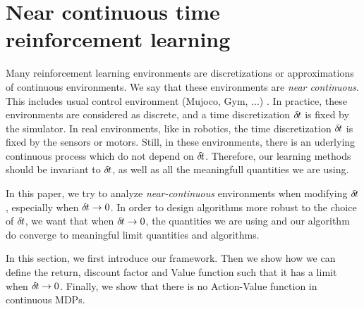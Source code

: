\section{Near continuous time reinforcement learning}
\label{sec:framework}


Many reinforcement learning environments are discretizations or approximations
of continuous environments. We say that these environments are \emph{near
continuous}. This includes usual control environment (Mujoco, Gym, ...)
. In practice, these environments are considered as discrete, and a
time discretization ${\delta\hspace{-.1em}t}$ is fixed by the simulator. In real environments,
like in robotics, the time discretization ${\delta\hspace{-.1em}t}$ is fixed by the sensors or
motors. Still, in these environments, there is an uderlying continuous process
which do not depend on ${\delta\hspace{-.1em}t}$. Therefore, our learning methods should be
invariant to ${\delta\hspace{-.1em}t}$, as well as all the meaningfull quantities we are using.

In this paper, we try to analyze \emph{near-continuous} environments when  modifying ${\delta\hspace{-.1em}t}$, especially when ${\delta\hspace{-.1em}t} \rightarrow 0$. In order to design algorithms more robust to the choice of ${\delta\hspace{-.1em}t}$, we want that when ${\delta\hspace{-.1em}t} \rightarrow 0$, the quantities we are using and our algorithm do converge to meaningful limit quantities and algorithms.


In this section, we first introduce our framework. Then we show how we can define the return, discount factor and Value function such that it has a limit when ${\delta\hspace{-.1em}t} \rightarrow 0$. Finally, we show that there is no Action-Value function in continuous MDPs.

